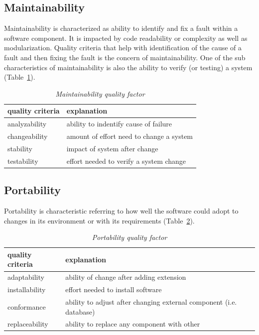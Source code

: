 \subsection{Maintainability}
Maintainability is characterized as ability to identify and fix a fault within a software component. It is impacted by code readability or complexity as well as modularization. Quality criteria that help with identification of the cause of a fault and then fixing the fault is the concern of maintainability.  One of the sub characteristics of maintainability is also the ability to verify (or testing) a system (Table~\ref{tab:maintainability_factor}). 

\begin{table}[h!]
	\centering
\begin{tabular}{|l|l|}
\hline
{\bf quality criteria} & {\bf explanation} \\
\hline
analyzability & ability to indentify cause of failure \\
\hline
changeability & amount of effort need to change a system \\
\hline
 stability & impact of system after change  \\
\hline
testability & effort needed to verify a system change \\
\hline
\end{tabular}	
	\caption{\textit{Maintainability quality factor}}
	\label{tab:maintainability_factor}
\end{table}



\subsection{Portability}
Portability is characteristic referring to how well the software could adopt to changes in its environment or with its requirements (Table~\ref{tab:portability_factor}). 

\begin{table}[h!]
	\centering
\begin{tabular}{|l|l|}
\hline
{\bf quality criteria} & {\bf explanation} \\
\hline
adaptability & ability of change after adding extension \\
\hline
installability & effort needed to install software \\
\hline
conformance &  ability to adjust after changing external component (i.e. database) \\
\hline
replaceability & ability to replace any component with other  \\
\hline
\end{tabular}	
	\caption{\textit{Portability quality factor}}
	\label{tab:portability_factor}
\end{table} 

